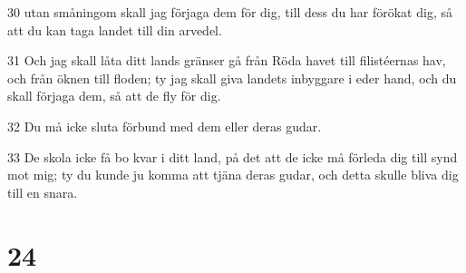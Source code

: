 \par 30 utan småningom skall jag förjaga dem för dig, till dess du har förökat dig, så att du kan taga landet till din arvedel.
\par 31 Och jag skall låta ditt lands gränser gå från Röda havet till filistéernas hav, och från öknen till floden; ty jag skall giva landets inbyggare i eder hand, och du skall förjaga dem, så att de fly för dig.
\par 32 Du må icke sluta förbund med dem eller deras gudar.
\par 33 De skola icke få bo kvar i ditt land, på det att de icke må förleda dig till synd mot mig; ty du kunde ju komma att tjäna deras gudar, och detta skulle bliva dig till en snara.

\chapter{24}

